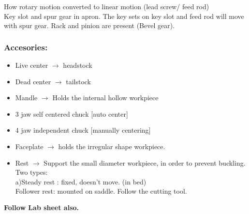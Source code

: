 \documentclass{article}
\begin{document}
\begin{multicols}{2}
How rotary motion converted to linear motion (lead screw/ feed rod)\\
Key slot and spur gear in apron. The key sets on key slot and feed rod will move with spur gear. Rack and pinion are present (Bevel gear). 

\subsubsection*{Accesories:}
\begin{itemize}
  \item Live center  $\rightarrow$ headstock 
  \item Dead center  $\rightarrow$ tailstock 
  \item Mandle  $\rightarrow$ Holds the internal hollow workpiece 
  \item 3 jaw self centered chuck [auto center]
  \item 4 jaw independent chuck [manually centering] 
  \item Faceplate  $\rightarrow$ holds the irregular shape workpiece. 
  \item Rest  $\rightarrow$ Support the small diameter workpiece, in order to prevent buckling. \\Two types:\\a)Steady rest : fixed, doesn't move. (in bed)\\Follower rest: mounted on saddle. Follow the cutting tool. 
\end{itemize}

\end{multicols}
\textbf{Follow Lab sheet also.}\\
\hrulefill
\end{document}
